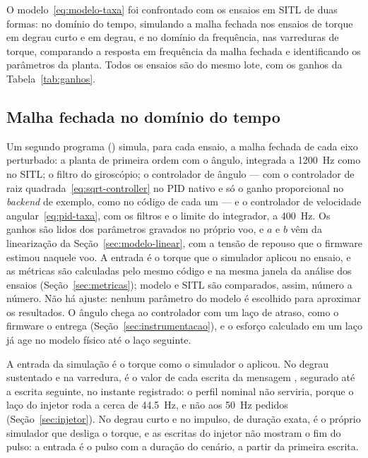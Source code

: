 O modelo~\eqref{eq:modelo-taxa} foi confrontado com os ensaios em SITL de
duas formas: no domínio do tempo, simulando a malha fechada nos ensaios de
torque em degrau curto e em degrau, e no domínio da frequência, nas varreduras de
torque, comparando a resposta em frequência da malha fechada e identificando
os parâmetros da planta. Todos os ensaios são do mesmo lote, com os ganhos da
Tabela~\ref{tab:ganhos}.

\subsection{Malha fechada no domínio do tempo}
\label{sec:validacao-tempo}

Um segundo programa () simula, para cada
ensaio, a malha fechada de cada eixo perturbado: a planta de primeira ordem
com o ângulo, integrada a \SI{1200}{\hertz} como no SITL; o filtro do
giroscópio; o controlador de ângulo --- com o controlador de raiz
quadrada~\eqref{eq:sqrt-controller} no PID nativo e só o ganho proporcional
no \textit{backend} de exemplo, como no código de cada um --- e o controlador
de velocidade angular~\eqref{eq:pid-taxa}, com os filtros e o limite do
integrador, a \SI{400}{\hertz}. Os ganhos são lidos dos parâmetros gravados
no próprio voo, e $a$ e $b$ vêm da linearização da
Seção~\ref{sec:modelo-linear}, com a tensão de repouso que o firmware estimou
naquele voo. A entrada é o torque que o simulador aplicou no ensaio, e as
métricas são calculadas pelo mesmo código e na mesma janela da análise dos
ensaios (Seção~\ref{sec:metricas}); modelo e SITL são comparados, assim,
número a número. Não há ajuste: nenhum parâmetro do modelo é escolhido para
aproximar os resultados. O ângulo chega ao controlador com um laço de atraso,
como o firmware o entrega (Seção~\ref{sec:instrumentacao}), e o esforço
calculado em um laço já age no modelo físico até o laço seguinte.

\begin{table}[htbp]
\centering
\caption{Métricas de rejeição de torque no SITL e no modelo linear em malha
fechada.}
\label{tab:validacao}
\small
\setlength{\tabcolsep}{4pt}


\end{table}

A entrada da simulação é o torque como o simulador o aplicou. No degrau
sustentado e na varredura, é o valor de cada escrita da mensagem
, segurado até a escrita seguinte, no instante registrado: o
perfil nominal não serviria, porque o laço do injetor roda a cerca de
\SI{44.5}{\hertz}, e não aos \SI{50}{\hertz} pedidos
(Seção~\ref{sec:injetor}). No degrau curto e no impulso, de duração exata, é
o próprio simulador que desliga o torque, e as escritas do injetor não
mostram o fim do pulso: a entrada é o pulso com a duração do cenário, a
partir da primeira escrita.

